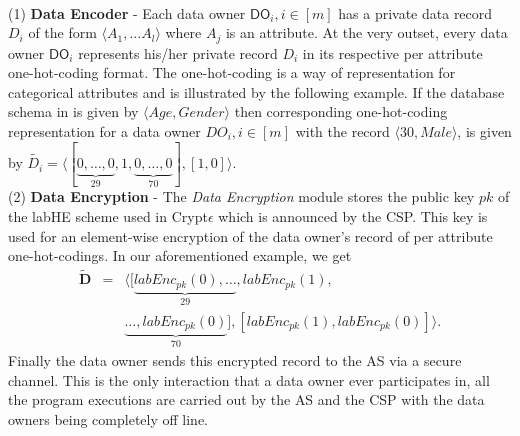 \\
(1)\textbf{ Data Encoder} -  Each data owner $\textsf{DO}_i, i \in [m]$ has a private data record $D_i$ of the form $\langle A_1,...A_l\rangle$ where ${A}_j$ is an attribute. At the very outset, every data owner  $\textsf{DO}_i$ represents his/her private record $D_i$ in its respective per attribute one-hot-coding format. The one-hot-coding is a way of representation for categorical attributes and is illustrated by the following example. 
If the database schema in \system is given by  $\langle Age,Gender\rangle$ then corresponding one-hot-coding representation for a data owner $DO_i, i \in [m]$ with the record $\langle 30, Male\rangle$, is given by $\tilde{D_i}=\langle[\underbrace{0,\ldots,0}_{29},1,\underbrace{0,\ldots,0}_{70}],[1,0]\rangle$. \\
(2)\textbf{ Data Encryption} - The \textit{Data Encryption} module stores the public key $pk$ of the labHE scheme used in Crypt$\epsilon$ which is announced by the CSP. This key is used for an element-wise encryption of the data owner's  record of per attribute one-hot-codings. In our aforementioned example, we get
\begin{eqnarray}
\mathbf{\tilde{D}}&=&\langle[\underbrace{labEnc_{pk}(0),\ldots}_{29},labEnc_{pk}(1),\nonumber \\
&& \underbrace{\ldots,labEnc_{pk}(0)}_{70}], [labEnc_{pk}(1),labEnc_{pk}(0)]\rangle. \nonumber \end{eqnarray}
Finally the data owner sends this encrypted record to the \textsf{AS} via a secure channel. This is the only interaction that a data owner ever participates in, all the program executions are carried out by the \textsf{AS} and the \textsf{CSP} with the data owners being completely off line.

